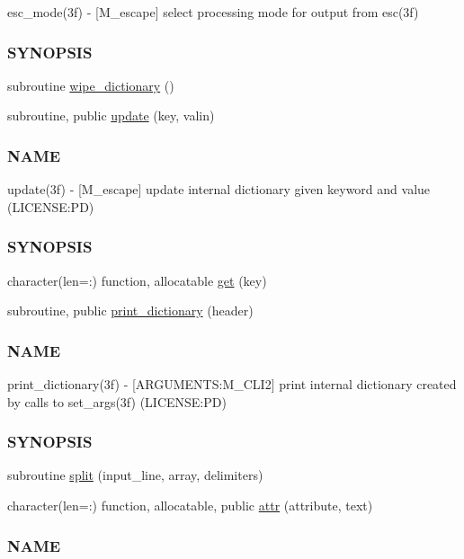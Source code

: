\begin{DoxyCompactItemize}
\begin{DoxyCompactList}
esc\+\_\+mode(3f) -\/ \mbox{[}M\+\_\+escape\mbox{]} select processing mode for output from esc(3f) \subsubsection*{S\+Y\+N\+O\+P\+S\+IS}\end{DoxyCompactList}\item 
subroutine \mbox{\hyperlink{namespacem__escape_a1bc574bc97157fe67d868d2bd180c91e}{wipe\+\_\+dictionary}} ()
\item 
subroutine, public \mbox{\hyperlink{namespacem__escape_a5efd612f60d281003917329484a7960c}{update}} (key, valin)
\begin{DoxyCompactList}\small\item\em \subsubsection*{N\+A\+ME}

update(3f) -\/ \mbox{[}M\+\_\+escape\mbox{]} update internal dictionary given keyword and value (L\+I\+C\+E\+N\+SE\+:PD) \subsubsection*{S\+Y\+N\+O\+P\+S\+IS}\end{DoxyCompactList}\item 
character(len=\+:) function, allocatable \mbox{\hyperlink{namespacem__escape_af555c90c278ff964d8bce93ee0368a42}{get}} (key)
\item 
subroutine, public \mbox{\hyperlink{namespacem__escape_a6add907828fd34e94b87f643a5cabc64}{print\+\_\+dictionary}} (header)
\begin{DoxyCompactList}\small\item\em \subsubsection*{N\+A\+ME}

print\+\_\+dictionary(3f) -\/ \mbox{[}A\+R\+G\+U\+M\+E\+N\+TS\+:M\+\_\+\+C\+L\+I2\mbox{]} print internal dictionary created by calls to set\+\_\+args(3f) (L\+I\+C\+E\+N\+SE\+:PD) \subsubsection*{S\+Y\+N\+O\+P\+S\+IS}\end{DoxyCompactList}\item 
subroutine \mbox{\hyperlink{namespacem__escape_af23bd97702864e0f32258e6ec0d51506}{split}} (input\+\_\+line, array, delimiters)
\item 
character(len=\+:) function, allocatable, public \mbox{\hyperlink{namespacem__escape_a916b16ce9be553d669f54cb9575a91be}{attr}} (attribute, text)
\begin{DoxyCompactList}\small\item\em \subsubsection*{N\+A\+ME}


\end{DoxyCompactList}
\end{DoxyCompactItemize}
